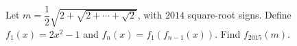 Let $m=\dfrac{1}{2}\sqrt{2+\sqrt{2+\cdots+\sqrt2}}$, with $2014$ square-root signs. Define $f_1(x)=2x^2-1$ and $f_n(x)=f_1(f_{n-1}(x))$. Find $f_{2015}(m)$.
